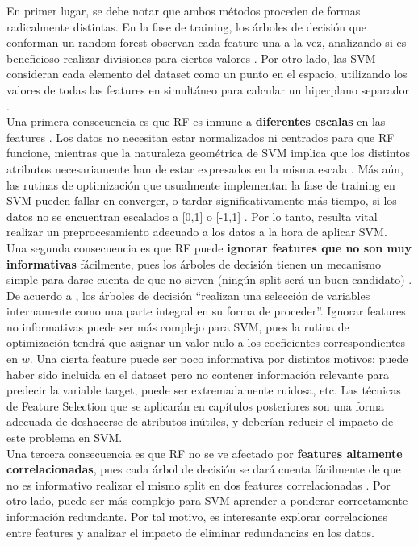 En primer lugar, se debe notar que ambos métodos proceden de formas radicalmente distintas. En la fase de training, los árboles de decisión que conforman un random forest observan cada feature una a la vez, analizando si es beneficioso realizar divisiones para ciertos valores \cite{mitchell}. Por otro lado, las SVM consideran cada elemento del dataset como un punto en el espacio, utilizando los valores de todas las features en simultáneo para calcular un hiperplano separador \cite{svm2}. \\

Una primera consecuencia es que RF es inmune a \textbf{diferentes escalas} en las features \cite{statisticallearning}. Los datos no necesitan estar normalizados ni centrados para que RF funcione, mientras que la naturaleza geométrica de SVM implica que los distintos atributos necesariamente han de estar expresados en la misma escala \cite{svm_practical}. Más aún, las rutinas de optimización que usualmente implementan la fase de training en SVM pueden fallar en converger, o tardar significativamente más tiempo, si los datos no se encuentran escalados a [0,1] o [-1,1]
\cite{svm_practical}. Por lo tanto, resulta vital realizar un preprocesamiento adecuado a los datos a la hora de aplicar SVM. \\ 

Una segunda consecuencia es que RF puede \textbf{ignorar features que no son muy informativas} fácilmente, pues los árboles de decisión tienen un mecanismo simple para darse cuenta de que no sirven (ningún split será un buen candidato) \cite{statisticallearning}. De acuerdo a \cite{statisticallearning}, los árboles de decisión ``realizan una selección de variables internamente como una parte integral en su forma de proceder''. Ignorar features no informativas puede ser más complejo para SVM, pues la rutina de optimización tendrá que asignar un valor nulo a los coeficientes correspondientes en $w$. Una cierta feature puede ser poco informativa por distintos motivos: puede haber sido incluida en el dataset pero no contener información relevante para predecir la variable target, puede ser extremadamente ruidosa, etc.  Las técnicas de Feature Selection que se aplicarán en capítulos posteriores son una forma adecuada de deshacerse de atributos inútiles, y deberían reducir el impacto de este problema en SVM. \\

Una tercera consecuencia es que RF no se ve afectado por \textbf{features altamente correlacionadas}, pues cada árbol de decisión se dará cuenta fácilmente de que no es informativo realizar el mismo split en dos features correlacionadas \cite{rf_collinearity}. Por otro lado, puede ser más complejo para SVM aprender a ponderar correctamente información redundante. Por tal motivo, es interesante explorar correlaciones entre features y analizar el impacto de eliminar redundancias en los datos. \\


